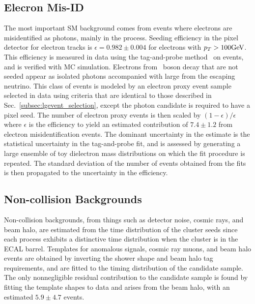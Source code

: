  \subsection{Elecron Mis-ID}
The most important SM background comes from events where
 electrons are misidentified as photons, mainly in the \wen process. 
Seeding efficiency in the pixel detector for
 electron tracks is $\epsilon = 0.982 \pm 0.004$ for
 electrons with $p_T > 100\mathrm{GeV}$. 
This efficiency is measured in data using the
 tag-and-probe method~\cite{Khachatryan:2010xn} on \zee events,
 and is verified with MC simulation. 
Electrons from \w\ boson decay that are not seeded
 appear as isolated photons accompanied with large \met from the escaping neutrino. 
This class of events is modeled by an electron proxy event sample
 selected in data using criteria that are identical to those described in 
 Sec.~\ref{subsec:lgevent_selection}, except the photon candidate is required to have
a pixel seed. 
The number of electron proxy events is then scaled by
 $(1-\epsilon)/\epsilon$ where $\epsilon$ is the efficiency
 to yield an estimated contribution of $7.4 \pm 1.2$ from
 electron misidentification events. 
The dominant uncertainty in the 
 estimate is the statistical uncertainty in the tag-and-probe fit, 
 and is assessed by generating a large ensemble
 of toy dielectron mass distributions
 on which the fit procedure is repeated. 
The standard deviation of the number
 of \zee events obtained from the fits is then propagated
 to the uncertainty in the efficiency.

 \subsection{Non-collision Backgrounds}
Non-collision backgrounds,  from  things such as detector noise,
 cosmic rays, and beam halo, are estimated from the time distribution of the cluster seeds
 since each process exhibits a distinctive time distribution when the cluster is
 in the ECAL barrel. 
Templates for anomalous signals, cosmic ray muons, and beam halo events
 are obtained by inverting the shower shape and beam halo tag requirements,
 and are fitted to the timing distribution of the candidate sample.
The only nonnegligible residual contribution to the candidate sample
 is found by fitting the template shapes to data
 and arises from the beam halo, with an estimated $5.9\pm4.7$ events.

